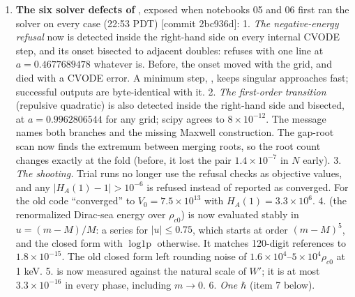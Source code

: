 \begin{enumerate}
  \item \textbf{The six solver defects of }, exposed when notebooks 05 and 06 first ran the solver on every case (22:53 PDT) [commit 2bc936d]: 1. \emph{The negative-energy refusal} now is detected inside the right-hand side on every internal CVODE step, and its onset bisected to adjacent doubles:  refuses with one line at $a = 0.4677689478$ whatever  is. Before, the onset moved with the grid, and  died with a CVODE  error. A minimum step, , keeps singular approaches fast; successful outputs are byte-identical with it. 2. \emph{The first-order transition} (repulsive quadratic) is also detected inside the right-hand side and bisected, at $a = 0.9962806544$ for any grid; scipy agrees to $8\times10^{-12}$. The message names both branches and the missing Maxwell construction. The gap-root scan now finds the extremum between merging roots, so the root count changes exactly at the fold (before, it lost the pair $1.4\times10^{-7}$ in $N$ early). 3. \emph{The  shooting.} Trial runs no longer use the refusal checks as objective values, and any $|H_A(1) - 1| > 10^{-6}$ is refused instead of reported as converged. For  the old code ``converged'' to $V_0 = 7.5\times10^{13}$ with $H_A(1) = 3.3\times10^{6}$. 4. \emph{} (the renormalized Dirac-sea energy over $\rho_{c0}$) is now evaluated stably in $u = (m - M)/M$: a series for $|u| \leq 0.75$, which starts at order $(m - M)^{5}$, and the closed form with $\operatorname{log1p}$ otherwise. It matches 120-digit references to $1.8\times10^{-15}$. The old closed form left rounding noise of $1.6\times10^{4}\text{--}5\times10^{4} \rho_{c0}$ at 1 keV. 5. \emph{} is now measured against the natural scale of $W'$; it is at most $3.3\times10^{-16}$ in every phase, including $m \to 0$. 6. \emph{One $\hbar$} (item 7 below).


\end{enumerate}
